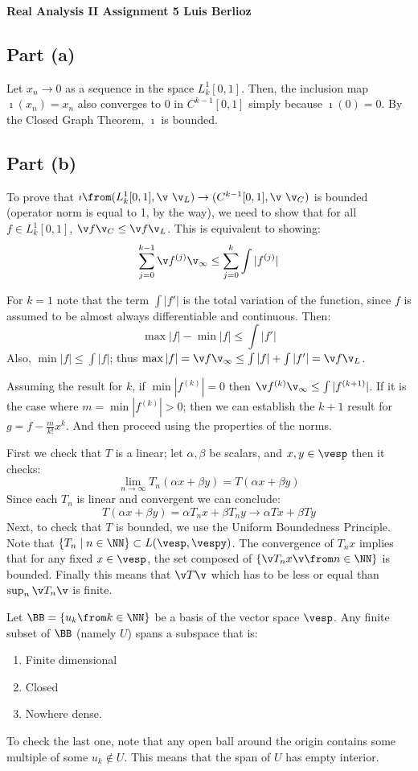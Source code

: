 \noindent\textbf{Real Analysis II Assignment 5 \hspace{\fill} Luis Berlioz}
\subsection*{Part (a)}
Let $x_n \to 0$ as a sequence in the space $L_k^1[0,1]$.
Then, the inclusion map $\imath(x_n)=x_n$ also converges to $0$ in $C^{k-1}[0,1]$ simply because $\imath(0)=0$. By the Closed Graph Theorem, $\imath$ is bounded.

\subsection*{Part (b)}
To prove that $\imath \from (L_k^1[0,1],\v \ \v_L) \to (C^{k-1}[0,1],\v\ \v_C)$ is bounded (operator norm is equal to 1, by the way), we need to show that for all $f\in L_k^1[0,1]$,  $\v f \v_C \leq \v f\v_L$. This is equivalent to showing:
$$\sum_{j=0}^{k-1} \v f^{(j)}\v_\infty \leq \sum_{j=0}^{k}\int | f^{(j)}|$$

For $k=1$ note that the term $\int |f'|$ is the total variation of the function, since $f$ is assumed to be almost always differentiable and continuous. Then:
$$\max|f| - \min |f| \leq \int |f'|$$
Also, $\min|f|\leq \int |f|$; thus $\max |f| = \v f\v_\infty \leq \int |f| + \int |f'|=\v f\v_L$.

Assuming the result for $k$, if $\min |f^{(k)}|=0$ then $\v f^{(k)}\v_\infty \leq \int|f^{(k+1)}|$. If it is the case where $m= \min |f^{(k)}|>0$; then we can establish the $k+1$ result for $g= f-\frac{m}{k!}x^k$. And then proceed using the properties of the norms.

First we check that $T$ is a linear; let $\alpha,\beta$ be scalars, and $x,y\in \vesp$ then it checks:
$$\lim_{n\to \infty} T_n(\alpha x+\beta y) = T(\alpha x+\beta y)$$
Since each $T_n$ is linear and convergent we can conclude:
$$T(\alpha x+\beta y)=\alpha T_nx +\beta T_n y \to \alpha Tx + \beta Ty$$
Next, to check that $T$ is bounded, we use the Uniform Boundedness Principle.
Note that $\{T_n \mid n\in\NN \} \subset L(\vesp, \vespy)$. 
The convergence of $T_nx$ implies that for any fixed  $x\in \vesp$, the set composed of $\{\v T_n x\v \from n\in \NN\}$ is bounded.
Finally this means that $\v T\v$ which has to be less or equal than $\sup_{n}\v T_n\v$ is finite.

Let $\BB=\{u_k\from k\in \NN\}$ be a basis of the vector space $\vesp$.
Any finite subset of $\BB$ (namely $U$) spans a subspace that is:
\begin{enumerate}
    \item Finite dimensional 
    \item Closed 
    \item Nowhere dense. 
\end{enumerate}
To check the last one, note that any open ball around the origin contains some multiple of some $u_k \notin U$.
This means that the span of $U$ has empty interior.

